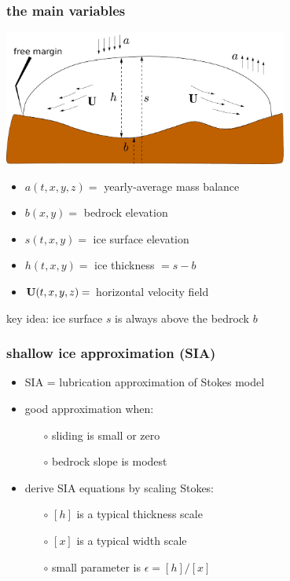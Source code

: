 \documentclass[hide notes,intlimits]{beamer}
\newcommand{\eps}{\epsilon}
\begin{document}
\begin{frame}
  \frametitle{the main variables}

\begin{center}
\includegraphics[width=0.7\textwidth]{groundedscheme}
\end{center}

\begin{itemize}
\small
\item $a(t,x,y,z)=$ yearly-average mass balance
\item $b(x,y)=$ bedrock elevation
\item $s(t,x,y)=$ ice surface elevation
\item $h(t,x,y)=$ ice thickness $ = s-b$
\item ${\bf U}(t,x,y,z)=$ horizontal velocity field
\end{itemize}

\begin{alertblock}{key idea: ice surface $s$ is always above the bedrock $b$}
\end{alertblock}
\end{frame}


\begin{frame}
  \frametitle{shallow ice approximation (SIA)}

\begin{itemize}
\item SIA = lubrication approximation of Stokes model
\item good approximation when:
  \begin{itemize}
  \item[$\circ$] sliding is small or zero
  \item[$\circ$] bedrock slope is modest
  \end{itemize}
\item derive SIA equations by scaling Stokes:
  \begin{itemize}
  \item[$\circ$] $[h]$ is a typical thickness scale
  \item[$\circ$] $[x]$ is a typical width scale
  \item[$\circ$] small parameter is $\eps = [h] / [x]$
  \end{itemize}
\end{itemize}
\end{frame}
\end{document}
